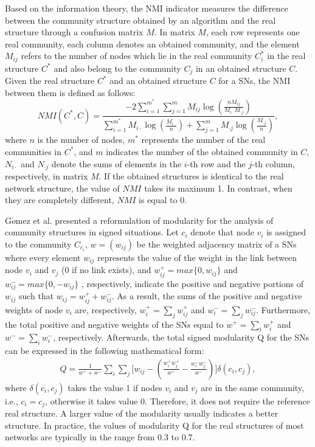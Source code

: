 \documentclass[10pt, journal]{IEEEtran}
\begin{document}
Based on the information theory, the NMI indicator measures the difference between the community structure obtained by an algorithm and the real structure through a confusion matrix $M$. In matrix $M$, each row represents one real community, each column denotes an obtained community, and the element $M_{ij}$ refers to the number of nodes which lie in the real community $C^{\ast}_i$ in the real structure $C^{\ast}$ and also belong to the community $C_j$ in an obtained structure $C$. Given the real structure $C^{\ast}$ and an obtained structure $C$ for a SNs, the NMI between them is defined as follows:
\begin{equation} \label{equ:NMI}
NMI(C^{\ast},C)= \frac{-2\sum_{i=1}^{m^{\ast}}\sum_{j=1}^{m}M_{ij}\log(\frac{nM_{ij}}{M_{i\cdot}M_{\cdot j}})}{\sum_{i=1}^{m^{\ast}} M_{i\cdot}\log(\frac{M_{i\cdot}}{n})+\sum_{j=1}^{m}M_{\cdot j}\log(\frac{M_{\cdot j}}{n})},
\end{equation}
where $n$ is the number of nodes, $m^{\ast}$ represents the number of the real communities in $C^{\ast}$, and $m$ indicates the number of the obtained community in $C$, $N_{i\cdot}$ and $N_{\cdot j}$ denote the sums of elements in the $i$-th row and the $j$-th column, respectively, in matrix $M$. If the obtained structures is identical to the real network structure, the value of $NMI$ takes its maximum 1. In contrast, when they are completely different, $NMI$ is equal to 0.

G$\acute{o}$mez et al.  presented a reformulation of modularity for the analysis of community structures in signed situations. Let $c_i$ denote that node $v_i$ is assigned to the community $C_{c_i}$, $w=(w_{ij})$ be the weighted adjacency matrix of a SNs where every element $w_{ij}$ represents the value of the weight in the link between node $v_i$ and $v_j$ (0 if no link exists), and $ w_{ij}^+=max\{0,w_{ij}\}$ and $w_{ij}^-=max\{0,-w_{ij}\} $ , respectively, indicate the positive and negative portions of $w_{ij}$ such that $w_{ij}=w_{ij}^+ + w_{ij}^- $. As a result, the sums of the positive and negative weights of node $v_i$ are, respectively, $ w_i^+=\sum_j w_{ij}^+ $ and $ w_i^-=\sum_j w_{ij}^- $. Furthermore, the total positive and negative weights of the SNs equal to $w^+=\sum_i w_i^+$ and $ w^-=\sum_i w_i^-$, respectively. Afterwards, the total signed modularity Q \cite{gomez2009analysis} for the SNs can be expressed in the following mathematical form:
\begin{equation}\label{Qdefinition}
\begin{aligned}
Q=\frac{1}{w^{+}+w^{-}}\sum_i\sum_j \Big[w_{ij}-(\frac{w_i^+w_j^+}{w^+}-\frac{w_i^-w_j^-}{w^-})\Big]\delta(c_i,c_j),
\end{aligned}
\end{equation}
where $\delta(c_i,c_j)$ takes the value 1 if nodes $v_i$ and $v_j$ are in the same community, i.e., $c_i=c_j$, otherwise it takes value 0. Therefore, it does not require the reference real structure. A larger value of the modularity usually indicates a better structure. In practice, the values of modularity Q for the real structures of most networks are typically in the range from 0.3 to 0.7.
\end{document}
